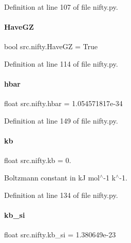 Definition at line 107 of file nifty.\+py.

\mbox{\label{namespacesrc_1_1nifty_aaf88bcbdbd381d12c8b8f252de831aea}} 
\paragraph{\texorpdfstring{Have\+GZ}{HaveGZ}}
{\footnotesize\ttfamily bool src.\+nifty.\+Have\+GZ = True}



Definition at line 114 of file nifty.\+py.

\mbox{\label{namespacesrc_1_1nifty_a3af7eb6b25ba3460807326b4a542c44a}} 
\paragraph{\texorpdfstring{hbar}{hbar}}
{\footnotesize\ttfamily float src.\+nifty.\+hbar = 1.\+054571817e-\/34}



Definition at line 149 of file nifty.\+py.

\mbox{\label{namespacesrc_1_1nifty_a089f6f141e72825090e5f20f8ad49281}} 
\paragraph{\texorpdfstring{kb}{kb}}
{\footnotesize\ttfamily float src.\+nifty.\+kb = 0.}



Boltzmann constant in kJ mol$^\wedge$-\/1 k$^\wedge$-\/1. 



Definition at line 134 of file nifty.\+py.

\mbox{\label{namespacesrc_1_1nifty_ad2e00824fb9acbea9ed5992470dd42d6}} 
\paragraph{\texorpdfstring{kb\+\_\+si}{kb\_si}}
{\footnotesize\ttfamily float src.\+nifty.\+kb\+\_\+si = 1.\+380649e-\/23}



